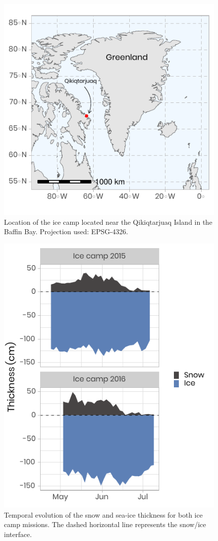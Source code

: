\documentclass[essd, manuscript]{copernicus}
\begin{document}
\begin{figure}[H]
	\centering
	\includegraphics[scale = 1]{../../../graphs/fig01.pdf}
	\caption{Location of the ice camp located near the Qikiqtarjuaq Island in the Baffin Bay. Projection used: EPSG-4326.}
\end{figure}

\begin{figure}[H]
	\centering
	\includegraphics[scale = 1]{../../../graphs/fig02.pdf}
	\caption{Temporal evolution of the snow and sea-ice thickness for both ice camp missions. The dashed horizontal line represents the snow/ice interface.}
\end{figure}
\end{document}
